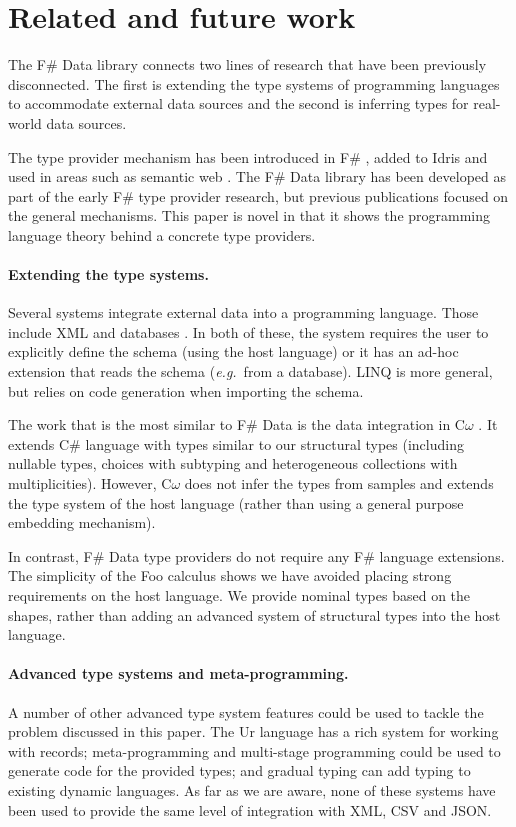 \documentclass[10pt]{sigplanconf}
\begin{document}
\section{Related and future work}
\label{sec:related}

The F\# Data library connects two lines of research that have been previously disconnected. The first is
extending the type systems of programming languages to accommodate external data sources and the second
is inferring types for real-world data sources.

The type provider mechanism has been introduced in F\# \cite{fsharp-typeprov,fsharp-typeprov-ddfp},
added to Idris  \cite{idris-tp} and used in areas such as semantic web \cite{liteq}. The F\# Data
library has been developed as part of the early F\# type provider research, but previous
publications focused on the general mechanisms. This paper is novel in that it shows the
programming language theory behind a concrete type providers.

\paragraph{Extending the type systems.}
Several systems integrate external data into a programming language. Those include
XML \cite{xduce,xduce-ml} and databases \cite{links}. In both of these, the system requires
the user to explicitly define the schema (using the host language) or it has an ad-hoc extension
that reads the schema (\emph{e.g.}~from a database). LINQ \cite{linq} is more general, but relies
on code generation when importing the schema.

The work that is the most similar to F\# Data is the data integration in C$\omega$ \cite{comega-xs}.
It extends C\# language with types similar to our structural types
(including nullable types, choices with subtyping and heterogeneous collections with multiplicities).
However, C$\omega$ does not infer the types from samples and extends the type system of the host
language (rather than using a general purpose embedding mechanism).

In contrast, F\# Data type providers do not require any F\# language extensions. The simplicity
of the Foo calculus shows we have avoided placing strong requirements on the host language. We
provide nominal types based on the shapes, rather than adding an advanced
system of structural types into the host language.

\paragraph{Advanced type systems and meta-programming.}
A number of other advanced type system features could be used to tackle the problem discussed
in this paper. The Ur \cite{ur} language has a rich system for working with records;
meta-programming \cite{template-hask,th-camlp4} and multi-stage programming \cite{multi-stage}
could be used to generate code for the provided types; and gradual typing \cite{gradual,gradual-js}
can add typing to existing dynamic languages. As far as we are aware, none of these
systems have been used to provide the same level of integration with XML, CSV and JSON.
\end{document}
